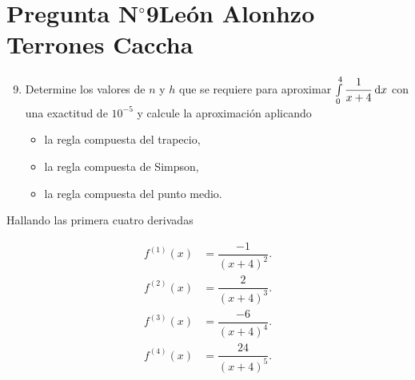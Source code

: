 \section{Pregunta N$^{\circ}$9\qquad León Alonhzo Terrones Caccha}

\begin{frame}
    \begin{enumerate}\setcounter{enumi}{8}
        \item

              Determine los valores de $n$ y $h$ que se requiere para
              aproximar
              \begin{math}
                  \int\limits_{0}^{4}
                  \dfrac{1}{x+4}
                  \dl x
              \end{math}
              con una exactitud de $10^{-5}$ y calcule la
              aproximación aplicando

              \begin{itemize}
                  \item

                        la regla compuesta del trapecio,

                  \item

                        la regla compuesta de Simpson,

                  \item

                        la regla compuesta del punto medio.
              \end{itemize}
    \end{enumerate}

    \begin{solution}
        Hallando las primera cuatro derivadas

        \begin{align*}
            f^{\left(1\right)}\left(x\right) &
            =\dfrac{-1}{{\left(x+4\right)}^{2}}. \\
            f^{\left(2\right)}\left(x\right) &
            =\dfrac{2}{{\left(x+4\right)}^{3}}.  \\
            f^{\left(3\right)}\left(x\right) &
            =\dfrac{-6}{{\left(x+4\right)}^{4}}. \\
            f^{\left(4\right)}\left(x\right) &
            =\dfrac{24}{{\left(x+4\right)}^{5}}.
        \end{align*}
    \end{solution}
\end{frame}


